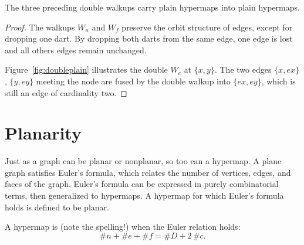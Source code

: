 \figYKJFZEB %


\figRVNJBTK %


\figCBQQAKM %


\figKLANQLT %


\begin{lemma}\label{lemma:dwalk-planar}  
The three preceding double walkups carry plain
hypermaps into plain hypermaps.
\end{lemma}
%

\begin{proof} The walkups $W_n$ and $W_f$ preserve the orbit structure
  of edges, except for dropping one dart.  By dropping both darts from
  the same edge, one edge is lost and all others edges remain
  unchanged.

  Figure~\ref{fig:doubleplain} illustrates the double $W_e$ at $\{x,y\}$.  The two
  edges $\{x,e x\}$, $\{y, e y\}$ meeting the node are fused by the
  double walkup into $\{e x, e y\}$, which is still an edge of cardinality
  two.
\end{proof}





\section{Planarity}
%
%

Just as a graph can be planar or nonplanar, so too can a hypermap.  A
plane graph satisfies Euler's formula, which relates the number of
vertices, edges, and faces of the graph.  Euler's formula can be
expressed in purely combinatorial terms, then generalized to
hypermaps.  A hypermap for which Euler's formula holds is defined to
be planar.  

\begin{definition}[planar]
A hypermap is  (note the
spelling!) when the Euler relation holds:
\[ \# n + \# e + \# f = \# D + 2\, \#c.\] 
%
\end{definition}


